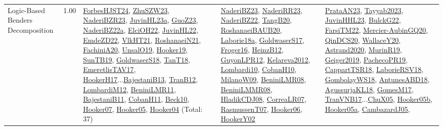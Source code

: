 {\begin{longtable}{p{3cm}r>{\raggedright\arraybackslash}p{6cm}>{\raggedright\arraybackslash}p{6cm}>{\raggedright\arraybackslash}p{8cm}}
\index{Logic-Based Benders Decomposition}\index{Concepts!Logic-Based Benders Decomposition}Logic-Based Benders Decomposition &  1.00 & \hyperref[detail:ForbesHJST24]{ForbesHJST24}, \hyperref[detail:ZhuSZW23]{ZhuSZW23}, \hyperref[detail:NaderiBZR23]{NaderiBZR23}, \hyperref[detail:JuvinHL23a]{JuvinHL23a}, \hyperref[detail:GuoZ23]{GuoZ23}, \hyperref[detail:NaderiBZ22a]{NaderiBZ22a}, \hyperref[detail:ElciOH22]{ElciOH22}, \hyperref[detail:JuvinHL22]{JuvinHL22}, \hyperref[detail:EmdeZD22]{EmdeZD22}, \hyperref[detail:VlkHT21]{VlkHT21}, \hyperref[detail:RoshanaeiN21]{RoshanaeiN21}, \hyperref[detail:FachiniA20]{FachiniA20}, \hyperref[detail:UnsalO19]{UnsalO19}, \hyperref[detail:Hooker19]{Hooker19}, \hyperref[detail:SunTB19]{SunTB19}, \hyperref[detail:GoldwaserS18]{GoldwaserS18}, \hyperref[detail:TanT18]{TanT18}, \hyperref[detail:EmeretlisTAV17]{EmeretlisTAV17}, \hyperref[detail:HookerH17]{HookerH17}...\hyperref[detail:BajestaniB13]{BajestaniB13}, \hyperref[detail:TranB12]{TranB12}, \hyperref[detail:LombardiM12]{LombardiM12}, \hyperref[detail:BeniniLMR11]{BeniniLMR11}, \hyperref[detail:BajestaniB11]{BajestaniB11}, \hyperref[detail:CobanH11]{CobanH11}, \hyperref[detail:Beck10]{Beck10}, \hyperref[detail:Hooker07]{Hooker07}, \hyperref[detail:Hooker05]{Hooker05}, \hyperref[detail:Hooker04]{Hooker04} (Total: 37) & \hyperref[detail:NaderiBZ23]{NaderiBZ23}, \hyperref[detail:NaderiRR23]{NaderiRR23}, \hyperref[detail:NaderiBZ22]{NaderiBZ22}, \hyperref[detail:TangB20]{TangB20}, \hyperref[detail:RoshanaeiBAUB20]{RoshanaeiBAUB20}, \hyperref[detail:Laborie18a]{Laborie18a}, \hyperref[detail:GoldwaserS17]{GoldwaserS17}, \hyperref[detail:Froger16]{Froger16}, \hyperref[detail:HeinzB12]{HeinzB12}, \hyperref[detail:GuyonLPR12]{GuyonLPR12}, \hyperref[detail:Kelareva2012]{Kelareva2012}, \hyperref[detail:Lombardi10]{Lombardi10}, \hyperref[detail:CobanH10]{CobanH10}, \hyperref[detail:MilanoW09]{MilanoW09}, \hyperref[detail:BeniniLMR08]{BeniniLMR08}, \hyperref[detail:BeniniLMMR08]{BeniniLMMR08}, \hyperref[detail:HladikCDJ08]{HladikCDJ08}, \hyperref[detail:CorreaLR07]{CorreaLR07}, \hyperref[detail:RasmussenT07]{RasmussenT07}, \hyperref[detail:Hooker06]{Hooker06}, \hyperref[detail:HookerY02]{HookerY02} & \hyperref[detail:PrataAN23]{PrataAN23}, \hyperref[detail:Tayyab2023]{Tayyab2023}, \hyperref[detail:JuvinHHL23]{JuvinHHL23}, \hyperref[detail:BulckG22]{BulckG22}, \hyperref[detail:FarsiTM22]{FarsiTM22}, \hyperref[detail:Mercier-AubinGQ20]{Mercier-AubinGQ20}, \hyperref[detail:QinDCS20]{QinDCS20}, \hyperref[detail:WallaceY20]{WallaceY20}, \hyperref[detail:Astrand2020]{Astrand2020}, \hyperref[detail:MurinR19]{MurinR19}, \hyperref[detail:Geiger2019]{Geiger2019}, \hyperref[detail:PachecoPR19]{PachecoPR19}, \hyperref[detail:CappartTSR18]{CappartTSR18}, \hyperref[detail:LaborieRSV18]{LaborieRSV18}, \hyperref[detail:GombolayWS18]{GombolayWS18}, \hyperref[detail:AntunesABD18]{AntunesABD18}, \hyperref[detail:AgussurjaKL18]{AgussurjaKL18}, \hyperref[detail:GomesM17]{GomesM17}, \hyperref[detail:TranVNB17]{TranVNB17}...\hyperref[detail:ChuX05]{ChuX05}, \hyperref[detail:Hooker05b]{Hooker05b}, \hyperref[detail:Hooker05a]{Hooker05a}, \hyperref[detail:CambazardJ05]{CambazardJ05}, 
\end{longtable}}
